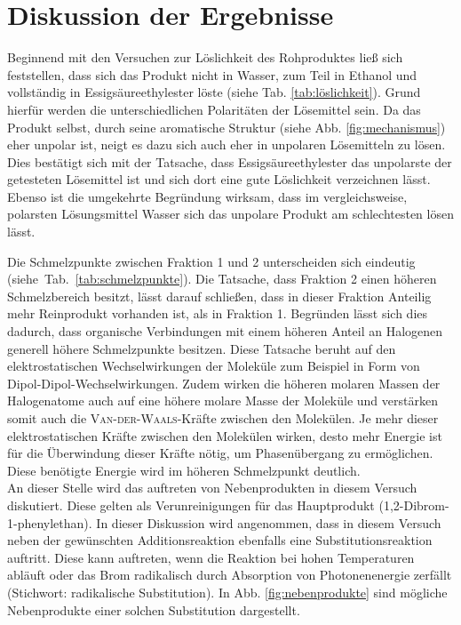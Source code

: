 \newpage
\section{Diskussion der Ergebnisse}
\label{sec:diskussion}

Beginnend mit den Versuchen zur Löslichkeit des Rohproduktes ließ sich feststellen, dass sich das Produkt nicht in Wasser, zum Teil in Ethanol und vollständig in Essigsäureethylester löste (siehe Tab. \ref{tab:löslichkeit}). Grund hierfür werden die unterschiedlichen Polaritäten der Lösemittel sein. Da das Produkt selbst, durch seine aromatische Struktur (siehe Abb. \ref{fig:mechanismus}) eher unpolar ist, neigt es dazu sich auch eher in unpolaren Lösemitteln zu lösen. Dies bestätigt sich mit der Tatsache, dass Essigsäureethylester das unpolarste der getesteten Lösemittel ist und sich dort eine gute Löslichkeit verzeichnen lässt. Ebenso ist die umgekehrte Begründung wirksam, dass im vergleichsweise, polarsten Lösungsmittel Wasser sich das unpolare Produkt am schlechtesten lösen lässt.


Die Schmelzpunkte zwischen Fraktion 1 und 2 unterscheiden sich eindeutig \mbox{(siehe Tab. \ref{tab:schmelzpunkte})}. Die Tatsache, dass Fraktion 2 einen höheren Schmelzbereich besitzt, lässt darauf schließen, dass in dieser Fraktion Anteilig mehr Reinprodukt vorhanden ist, als in Fraktion 1. Begründen lässt sich dies dadurch, dass organische Verbindungen mit einem höheren Anteil an Halogenen generell höhere Schmelzpunkte besitzen. Diese Tatsache beruht auf den elektrostatischen Wechselwirkungen der Moleküle zum Beispiel in Form von Dipol-Dipol-Wechselwirkungen. Zudem wirken die höheren molaren Massen der Halogenatome auch auf eine höhere molare Masse der Moleküle und verstärken somit auch die \textsc{Van-der-Waals}-Kräfte zwischen den Molekülen. Je mehr dieser elektrostatischen Kräfte zwischen den Molekülen wirken, desto mehr Energie ist für die Überwindung dieser Kräfte nötig, um Phasenübergang zu ermöglichen. Diese benötigte Energie wird im höheren Schmelzpunkt deutlich.\\

An dieser Stelle wird das auftreten von Nebenprodukten in diesem Versuch diskutiert. Diese gelten als Verunreinigungen für das Hauptprodukt (1,2-Dibrom-1-phenylethan). In dieser Diskussion wird angenommen, dass in diesem Versuch neben der gewünschten Additionsreaktion ebenfalls eine Substitutionsreaktion auftritt. Diese kann auftreten, wenn die Reaktion bei hohen Temperaturen abläuft oder das Brom radikalisch durch Absorption von Photonenenergie zerfällt (Stichwort: radikalische Substitution). In Abb. \ref{fig:nebenprodukte} sind mögliche Nebenprodukte einer solchen Substitution dargestellt. \\
\newpage

